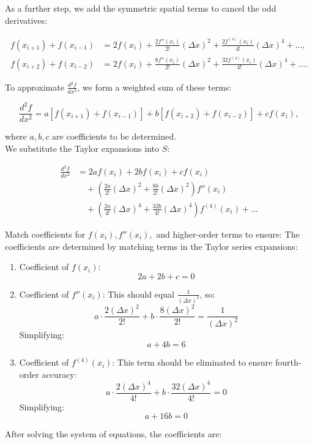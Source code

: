 \documentclass{article}
\begin{document}
As a further step, we add the symmetric spatial terms to cancel the odd derivatives:

\begin{align*}
f(x_{i+1}) + f(x_{i-1}) &= 2f(x_i) + \frac{2f''(x_i)}{2!}(\Delta x)^2 + \frac{2f^{(4)}(x_i)}{4!}(\Delta x)^4 + \dots, \\
f(x_{i+2}) + f(x_{i-2}) &= 2f(x_i) + \frac{8f''(x_i)}{2!}(\Delta x)^2 + \frac{32f^{(4)}(x_i)}{4!}(\Delta x)^4 + \dots.
\end{align*}


To approximate \( \frac{d^2f}{dx^2} \), we form a weighted sum of these terms:

\[
\frac{d^2f}{dx^2} = a [f(x_{i+1}) + f(x_{i-1})] + b [f(x_{i+2}) + f(x_{i-2})] + c f(x_i),
\]

where \( a, b, c \) are coefficients to be determined. \\
We substitute the Taylor expansions into \( S \):

\begin{align*}
  \frac{d^2f}{dx^2} &= 2a f(x_i) + 2b f(x_i) + c f(x_i) \\
  &\quad + \left( \frac{2a}{2!} (\Delta x)^2 + \frac{8b}{2!} (\Delta x)^2 \right) f''(x_i) \\
  &\quad + \left( \frac{2a}{4!} (\Delta x)^4 + \frac{32b}{4!} (\Delta x)^4 \right) f^{(4)}(x_i) + \dots
\end{align*}

Match coefficients for \( f(x_i), f''(x_i), \) and higher-order terms to ensure:
The coefficients are determined by matching terms in the Taylor series expansions:

\begin{enumerate}
  \item Coefficient of \( f(x_i) \):
  \[
  2a + 2b + c = 0
  \]
  \item Coefficient of \( f''(x_i) \): This should equal \( \frac{1}{(\Delta x)^2} \), so:
  \[
  a \cdot \frac{2(\Delta x)^2}{2!} + b \cdot \frac{8(\Delta x)^2}{2!} = \frac{1}{(\Delta x)^2}
  \]
  Simplifying:
  \[
  a + 4b = 6
  \]
  \item Coefficient of \( f^{(4)}(x_i) \): This term should be eliminated to ensure fourth-order accuracy:
  \[
  a \cdot \frac{2(\Delta x)^4}{4!} + b \cdot \frac{32(\Delta x)^4}{4!} = 0
  \]
  Simplifying:
  \[
  a + 16b = 0
  \]
\end{enumerate}


After solving the system of equations, the coefficients are:
\end{document}

